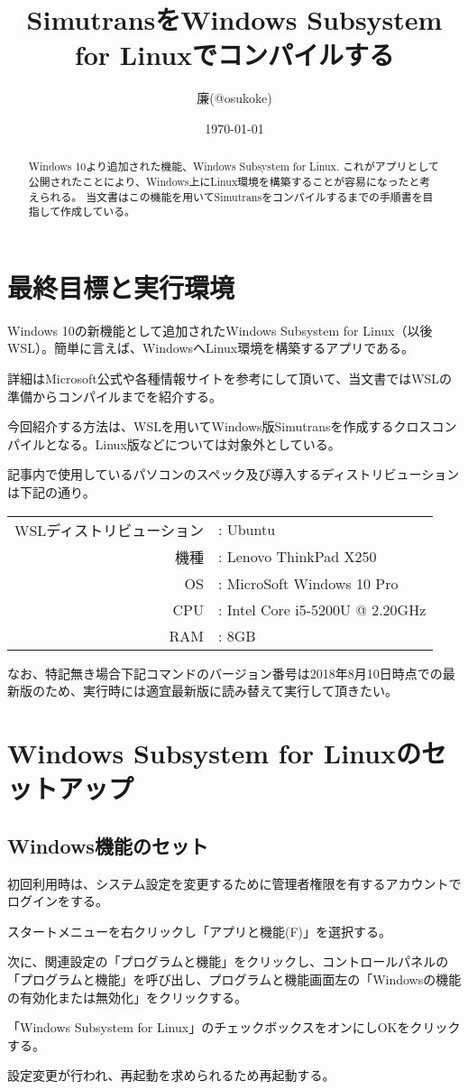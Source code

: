 \documentclass[autodetect-engine,dvipdfmx-if-dvi,ja=standard,a4j]{bxjsarticle}
\title{SimutransをWindows Subsystem for Linuxでコンパイルする}
\author{廉(@osukoke)}
\date{\today}
\begin{document}
	\maketitle
	\begin{abstract}
		Windows 10より追加された機能、Windows Subsystem for Linux.
		これがアプリとして公開されたことにより、Windows上にLinux環境を構築することが容易になったと考えられる。
		当文書はこの機能を用いてSimutransをコンパイルするまでの手順書を目指して作成している。
	\end{abstract}
	\section{最終目標と実行環境}
		Windows 10の新機能として追加されたWindows Subsystem for Linux（以後WSL）。簡単に言えば、WindowsへLinux環境を構築するアプリである。\par \noindent
		詳細はMicrosoft公式や各種情報サイトを参考にして頂いて、当文書ではWSLの準備からコンパイルまでを紹介する。\par
		今回紹介する方法は、WSLを用いてWindows版Simutransを作成するクロスコンパイルとなる。Linux版などについては対象外としている。\par
		記事内で使用しているパソコンのスペック及び導入するディストリビューションは下記の通り。\par\noindent
		\begin{center}	
			\begin{tabular}{rl}
				WSLディストリビューション & : Ubuntu\\
				機種 & : Lenovo ThinkPad X250\\
				OS & : MicroSoft Windows 10 Pro\\
				CPU & : Intel Core i5-5200U @ 2.20GHz\\
				RAM & : 8GB\\
			\end{tabular}
		\end{center}
	\par
		なお、特記無き場合下記コマンドのバージョン番号は2018年8月10日時点での最新版のため、実行時には適宜最新版に読み替えて実行して頂きたい。\par
	\section{Windows Subsystem for Linuxのセットアップ}
		\subsection{Windows機能のセット}
			初回利用時は、システム設定を変更するために管理者権限を有するアカウントでログインをする。\par\noindent
			スタートメニューを右クリックし「アプリと機能(F)」を選択する。\par
			次に、関連設定の「プログラムと機能」をクリックし、コントロールパネルの「プログラムと機能」を呼び出し、プログラムと機能画面左の「Windowsの機能の有効化または無効化」をクリックする。\par\noindent
			「Windows Subsystem for Linux」のチェックボックスをオンにしOKをクリックする。\par
			設定変更が行われ、再起動を求められるため再起動する。
\end{document}
